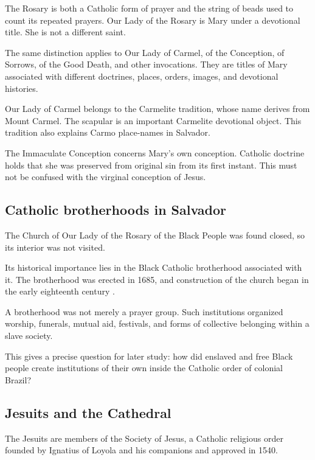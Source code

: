The Rosary is both a Catholic form of
prayer and the string of beads used to
count its repeated prayers.  Our Lady of
the Rosary is Mary under a devotional
title.  She is not a different saint.

The same distinction applies to Our Lady
of Carmel, of the Conception, of Sorrows,
of the Good Death, and other invocations.
They are titles of Mary associated with
different doctrines, places, orders,
images, and devotional histories.

Our Lady of Carmel belongs to the
Carmelite tradition, whose name derives
from Mount Carmel.  The scapular is an
important Carmelite devotional object.
This tradition also explains Carmo
place-names in Salvador.

The Immaculate Conception concerns Mary's
own conception.  Catholic doctrine holds
that she was preserved from original sin
from its first instant.  This must not be
confused with the virginal conception of
Jesus.

\subsection{Catholic brotherhoods in Salvador}
\label{religion-section-rosario-dos-pretos}

The Church of Our Lady of the Rosary of
the Black People was found closed, so its
interior was not visited.

Its historical importance lies in the
Black Catholic brotherhood associated
with it.  The brotherhood was erected in
1685, and construction of the church began
in the early eighteenth century
\cite{ipac-rosario}.

A brotherhood was not merely a prayer
group.  Such institutions organized
worship, funerals, mutual aid, festivals,
and forms of collective belonging within
a slave society.

This gives a precise question for later
study: how did enslaved and free Black
people create institutions of their own
inside the Catholic order of colonial
Brazil?

\subsection{Jesuits and the Cathedral}
\label{religion-section-jesuits-cathedral}

The Jesuits are members of the Society of
Jesus, a Catholic religious order founded
by Ignatius of Loyola and his companions
and approved in 1540.

